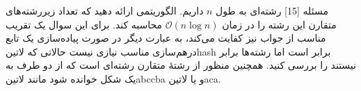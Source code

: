 ‌مسئله [15]
رشته‌ای به طول $n$ داریم. الگوریتمی ارائه دهید که تعداد زیررشته‌های متقارن این رشته را در زمان
$\mathcal{O}(n \log n)$
	محاسبه کند. برای این سوال یک تقریب مناسب از جواب نیز کفایت می‌کند، به عبارت دیگر در صورت پیاده‌سازی یک تابع درهم‌سازی مناسب نیازی نیست حالاتی که  ‌لاتین{hash} برابر است اما رشته‌ها برابر نیستند را بررسی کنید. همچنین
	منظور از رشتۀ متقارن رشته‌ای است که از دو طرف به یک شکل خوانده شود مانند ‌لاتین{abccba} و یا ‌لاتین{aca}.  


